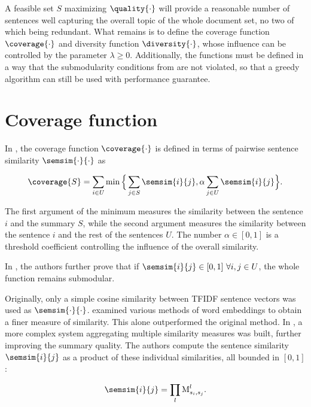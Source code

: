 A feasible set $S$ maximizing $\quality{\cdot}$ will provide a reasonable number of sentences well capturing the overall topic of the whole document set, no two of which being redundant. What remains is to define the coverage function $\coverage{\cdot}$ and diversity function $\diversity{\cdot}$, whose influence can be controlled by the parameter $\lambda \geq 0$. Additionally, the functions must be defined in a way that the submodularity conditions from \cite{multi-summarization-1} are not violated, so that a greedy algorithm can still be used with performance guarantee.


\section{Coverage function}

In \cite{multi-summarization-2}, the coverage function $\coverage{\cdot}$ is defined in terms of pairwise sentence similarity $\semsim{\cdot}{\cdot}$ as

\begin{equation}
\coverage{S} = \sum_{i \in U}{\min{\Big\{ \sum_{j \in S}{\semsim{i}{j}}, \alpha \sum_{j \in U}{\semsim{i}{j}} \Big\} }}.
\end{equation}

The first argument of the minimum measures the similarity between the sentence $i$ and the summary $S$, while the second argument measures the similarity between the sentence $i$ and the rest of the sentences $U$. The number $\alpha \in [0,1]$ is a threshold coefficient controlling the influence of the overall similarity.

In \cite{multi-summarization-1}, the authors further prove that if $\semsim{i}{j} \in [0,1]\ \forall i, j \in U$, the whole function remains submodular.

Originally, only a simple cosine similarity between TFIDF sentence vectors \citep{information-retrieval} was used as $\semsim{\cdot}{\cdot}$. \cite{mogren-1} examined various methods of word embeddings to obtain a finer measure of similarity. This alone outperformed the original method. In \cite{mogren-2}, a more complex system aggregating multiple similarity measures was built, further improving the summary quality. The authors compute the sentence similarity $\semsim{i}{j}$ as a product of these individual similarities, all bounded in $[0, 1]$:

\begin{equation} \label{eq:aggregated-similarity}
	\semsim{i}{j} = \prod_{l}{\similarity_{s_{i}, s_{j}}^{l}}.
\end{equation}

